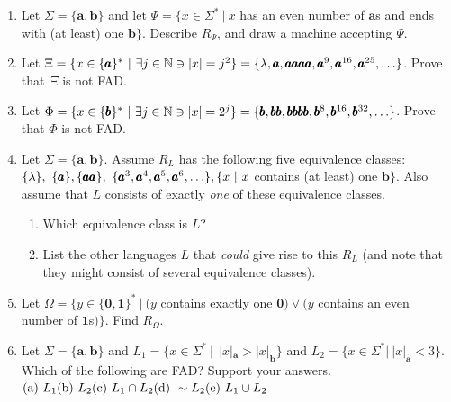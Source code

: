 \begin{enumerate}[{2.}1.]
\item Let $\Sigma=\{\pmb{a},\pmb{b}\}$ and let $\Psi=\{x \in \Sigma^*\ |\ x$ has an
even number of $\pmb{a}$s and ends with (at least) one $\pmb{b}\}$.
Describe $R_{\Psi}$, and draw a machine accepting $\Psi$.

\item Let $\Xi=\{x \in \{\pmb{a}\}^*\ |\ \exists j \in \NN \ni |x| = j^2\} =
\{\lambda,\pmb{a},\pmb{aaaa},\pmb{a}^9,\pmb{a}^{16},\pmb{a}^{25}, \ldots \}$.
Prove that $\Xi$ is not FAD.

\item Let $\Phi=\{x \in \{\pmb{b}\}^*\ |\ \exists j \in \NN \ni |x| = 2^j\} = 
\{\pmb{b},\pmb{bb},\pmb{bbbb},\pmb{b}^8,\pmb{b}^{16},\pmb{b}^{32}, \ldots \}$.
Prove that $\Phi$ is not FAD.

\item Let $\Sigma=\{\pmb{a},\pmb{b}\}$. Assume $R_L$ has the following five
equivalence classes: $\{\lambda\},\ \{\pmb{a}\}, \{\pmb{aa}\},\ \{\pmb{a}^3,
\pmb{a}^4,\pmb{a}^5,\pmb{a}^6, \ldots \},\linebreak\{x\ |\ x$ contains (at least) one
$\pmb{b}\}$. Also assume that $L$ consists of exactly \emph{one} of these equivalence
classes.
\begin{enumerate}
\item Which equivalence class is $L$?
\item List the other languages $L$ that \emph{could} give rise to this $R_L$
(and note that they might consist of several equivalence classes).
\end{enumerate}

\item Let $\Omega=\{y \in \{\pmb{0},\pmb{1}\}^*\ |\ (y$ contains exactly one 
$\pmb{0}) \vee (y$ contains an even number of $\pmb{1}$s$)\}$. Find $R_\Omega$.

\item Let $\Sigma=\{\pmb{a},\pmb{b}\}$ and $L_1=\{x \in \Sigma^*\ |\ \ |x|_{\pmb{a}} 
> |x|_{\pmb{b}}\}$ and $L_2=\{x \in \Sigma^*|\ |x|_{\pmb{a}} < 3\}$. Which of
the following are FAD? Support your answers. \\
$\text{(a) }L_1\hfill\text{(b) }L_2\hfill\text{(c) }L_1 \cap L_2\hfill
\text{(d) }\sim   L_2\hfill\text{(e) }L_1 \cup L_2$


\end{enumerate}
